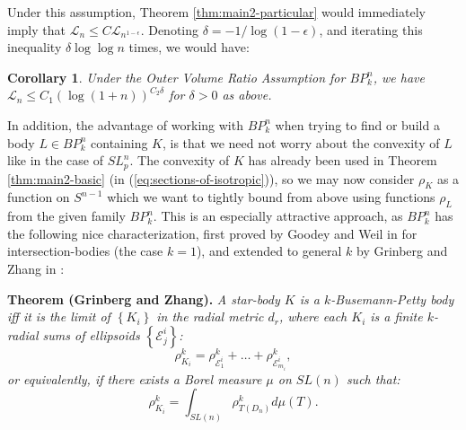 \documentclass[12pt,oneside]{amsart}
\newtheorem{cor}[thm]{Corollary}
\theoremstyle{definition}
\theoremstyle{remark}
\theoremstyle{proof}
\numberwithin{equation}{section}
\newcommand{\set}[1]{\left\{#1\right\}}
\newcommand{\E}{\mathcal{E}}
\newcommand{\BP}{BP}
\renewcommand{\MR}{\widetilde{M}} %
\renewcommand{\L}{\mathcal{L}}
\newcommand{\Vol}[1]{\textnormal{Vol} (#1)}
\begin{document}
\smallskip
Under this assumption, Theorem \ref{thm:main2-particular} would
immediately imply that $\L_n \leq C \L_{n^{1-\epsilon}}$.
Denoting $\delta = -1 / \log(1-\epsilon)$, and iterating this
inequality $\delta \log \log n$ times, we would have:

\begin{cor}
Under the Outer Volume Ratio Assumption for $\BP_k^n$, we have
$\L_n \leq C_1 (\log(1+n))^{C_2 \delta}$ for $\delta>0$ as above.
\end{cor}

\smallskip
In addition, the advantage of working with $\BP_k^n$ when trying
to find or build a body $L \in \BP_k^n$ containing $K$, is that
we need not worry about the convexity of $L$ like in the case of
$SL_p^n$. The convexity of $K$ has already been used in Theorem
\ref{thm:main2-basic} (in (\ref{eq:sections-of-isotropic})), so we
may now consider $\rho_K$ as a function on $S^{n-1}$ which we
want to tightly bound from above using functions $\rho_L$ from
the given family $\BP_k^n$. This is an especially attractive
approach, as $\BP_k^n$ has the following nice characterization,
first proved by Goodey and Weil in \cite{Goodey-Weil} for
intersection-bodies (the case $k=1$), and extended to general $k$
by Grinberg and Zhang in \cite{Grinberg-Zhang}:

\smallskip
\noindent\textbf{Theorem (Grinberg and Zhang). }\emph{A star-body
$K$ is a $k$-Busemann-Petty body iff it is the limit
of $\set{K_i}$ in the radial metric $d_r$, where each $K_i$ is a
finite $k$-radial sums of ellipsoids $\set{\E^i_j}$:
\[
\rho^k_{K_i} = \rho^k_{\E^i_1} + \ldots + \rho^k_{\E^i_{m_i}},
\]
or equivalently, if there exists a Borel measure $\mu$ on $SL(n)$
such that:
\[
\rho^k_{K_i} = \int_{SL(n)} \rho^k_{T(D_n)} d\mu(T).
\]
}

\end{document}
